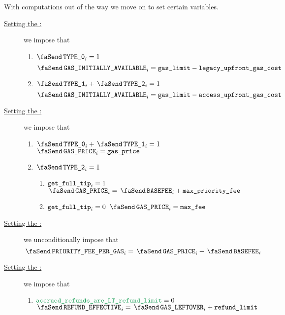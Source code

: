 \begin{center}
\end{center}
With computations out of the way we move on to set certain variables.
\begin{description}
        \item[\underline{Setting the \txInitialGas:}] 
                we impose that
                \begin{enumerate}
                        \item \If $\txIsLegacy _{i} = 1$ \Then
                                \[ \txInitialGas  _{i} = \locGasLimit - \locLegacyUpfrontGasCost \]
                        \item \If $\txIsAccessSet _{i} + \txIsTypeTwo _{i} = 1$ \Then
                                \[ \txInitialGas  _{i} = \locGasLimit - \locAccessUpfrontGasCost \]
                \end{enumerate}
        \item[\underline{Setting the \txGasPrice:}] 
                we impose that
                \begin{enumerate}
                        \item \If $\txIsLegacy _{i} + \txIsAccessSet _{i} = 1$ \Then $\txGasPrice  _{i} = \locGasPrice$
                        \item \If $\txIsTypeTwo_{i} = 1$ \Then
                                \begin{enumerate}
                                        \item \If $\texttt{get\_full\_tip}_{i} = 1$ \Then $\txGasPrice  _{i} = \txBasefee_{i} + \locMaxPriorityFee$
                                        \item \If $\texttt{get\_full\_tip}_{i} = 0$ \Then $\txGasPrice  _{i} = \locMaxFee$
                                \end{enumerate}
                \end{enumerate}
        \item[\underline{Setting the \txPriorityFeePerGas:}] 
                we unconditionally impose that
                \[
                        \txPriorityFeePerGas  _{i} = \txGasPrice_{i} - \txBasefee_{i}
                \]
        \item[\underline{Setting the \txEffectiveRefund:}]
                we impose that
                \begin{enumerate}
                        \item \If $\locAccruedRefundsAreLtRefundLimit = 0$ \Then $\txEffectiveRefund _{i} = \txLeftoverGas _{i} + \locRefundLimit$

\end{enumerate}
\end{description}

